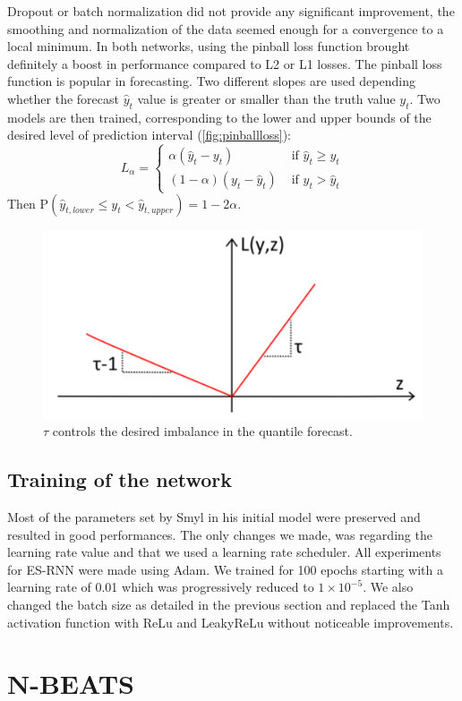 \documentclass{article}
\newcommand{\p}{\mathrm{P}}
\begin{document}
Dropout or batch normalization did not provide any significant improvement, the smoothing and normalization of the data seemed enough for a convergence to a local minimum.
In both networks, using the pinball loss function brought definitely a boost in performance compared to L2 or L1 losses. The pinball loss function is popular in forecasting. 
Two different slopes are used depending whether the forecast $\hat{y}_t$ value is greater
or smaller than the truth value $y_t$. Two models are then trained, corresponding to the lower and upper bounds of the desired level of prediction interval (\autoref{fig:pinballloss}):
\[
	L_\alpha = 
	\begin{cases}
		\alpha (\hat{y}_t  - y_t) & \text{ if } \hat{y}_t \geq y_t \\
		(1-\alpha) (y_t - \hat{y}_t) & \text{ if }  y_t > \hat{y}_t
	\end{cases}
\]
Then $\p(\hat{y}_{t, lower} \le y_t < \hat{y}_{t, upper}) = 1 - 2 \alpha$.
\begin{figure}[!ht]
\centering
	\includegraphics[width=0.4\columnwidth]{pinballloss.png} 
\caption{$\tau$ controls the desired imbalance in the quantile forecast.}
\label{fig:pinballloss}
\end{figure}

\subsection{Training of the network}

Most of the parameters set by Smyl in his initial model were preserved and resulted in good performances. 
The only changes we made, was regarding the learning rate value and that we used a learning rate scheduler.  All experiments for ES-RNN were made 
using Adam. We trained for 100 epochs starting with a learning rate of 0.01 which was progressively reduced to $1 \times 10^{-5}$.
We also changed the batch size as detailed in the previous section and replaced the Tanh activation function with ReLu and LeakyReLu without noticeable improvements.


\section{N-BEATS}
\label{NBEATS}
\end{document}
